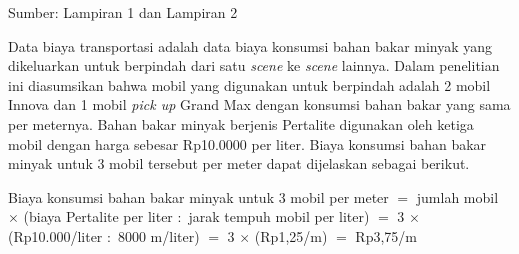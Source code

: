{    \vspace{-8mm}
    \begin{flushright}
        Sumber: Lampiran 1 dan Lampiran 2
    \end{flushright}

    Data biaya transportasi adalah data biaya konsumsi bahan bakar minyak yang dikeluarkan untuk berpindah dari satu \textit{scene} ke \textit{scene} lainnya.
    Dalam penelitian ini diasumsikan bahwa mobil yang digunakan untuk berpindah adalah 2 mobil Innova dan 1 mobil \textit{pick up} Grand Max dengan konsumsi bahan bakar yang sama per meternya.
    Bahan bakar minyak berjenis Pertalite digunakan oleh ketiga mobil dengan harga sebesar Rp10.0000 per liter.
    Biaya konsumsi bahan bakar minyak untuk 3 mobil tersebut per meter dapat dijelaskan sebagai berikut.

    \noindent
    Biaya konsumsi bahan bakar minyak untuk 3 mobil per meter $=$ jumlah mobil $\times$ (biaya Pertalite per liter $:$ jarak tempuh mobil per liter) $=$ 3 $\times$ (Rp10.000/liter $:$ 8000 m/liter) $=$ 3 $\times$ (Rp1,25/m) $=$ Rp3,75/m


}

\pagebreak